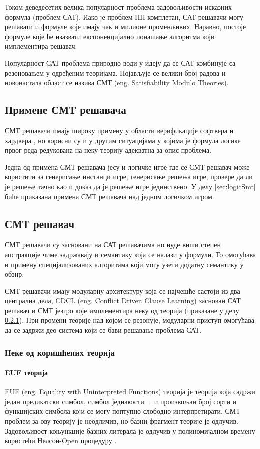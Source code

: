 \documentclass[a4paper]{article}
\begin{document}
Током деведесетих велика популарност проблема задовољивости исказних формула (проблем САТ). Иако је проблем НП комплетан,
САТ решавачи могу решавати и формуле које имају чак и милионе променљивих. Наравно, постоје формуле које ће изазвати
експоненцијално понашање алгоритма који имплементира решавач.

Популарност САТ проблема природно води у идеју да се САТ комбинује са резоновањем у одређеним теоријама. Појављује
се велики број радова и новонастала област се назива СМТ (eng. Satisfiability Modulo Theories).

\subsection{Примене СМТ решавача}
СМТ решавачи имају широку примену у области верификације софтвера и хардвера \cite{smtexample1, smtexample2, smtexample3, smtexample4}, но корисни су и у другим ситуацијама
у којима је формула логике првог реда редукована на неку теорију адекватна за опис проблема.


Једна од примена СМТ решавача јесу и логичке игре где се СМТ решавач може користити за генерисање инстанци игре,
генерисање решења игре, провере да ли је решење тачно као и доказ да је решење игре јединствено. У делу
\ref{sec:logicSmt} биће приказана примена СМТ решавача над једном логичком игром.

\subsection{СМТ решавач}
СМТ решавачи су засновани на САТ решавачима но нуде виши степен апстракције чиме задржавају и семантику која се
налази у формули. То омогућава и примену специјализованих алгоритама који могу узети додатну семантику у обзир.

СМТ решавачи имају модуларну архитектуру која се најчешће састоји из два централна дела,
CDCL (eng. Conflict Driven Clause Learning) заснован САТ решавач и СМТ језгро које имплементира
неку од теорија (приказане у делу \ref{subsubsec:theories}). При промени теорије над којом се резонује, модуларни приступ
омогућава да се задржи део система који се бави решавање проблема САТ.


\subsubsection{Неке од коришћених теорија}
\label{subsubsec:theories}

\paragraph{EUF теорија} EUF (eng. Equality with Uninterpreted Functions) теорија је теорија која садржи један предикатски симбол, симбол једнакости = и произвољан број сорти
и функцијских симбола који се могу поптупно слободно интерпретирати.
СМТ проблем за ову теорију је неодличив, но базни фрагмент теорије је одлучив. Задовољивост коњункције базних литерала
је одлучив у полиномијалном времену користећи Нелсон-Open процедуру \cite{handbookar}.
\end{document}
